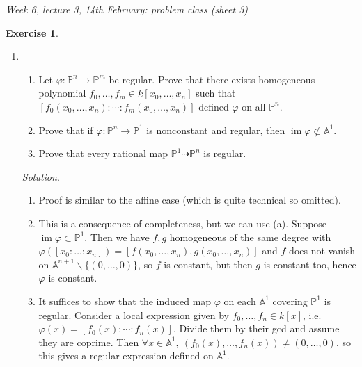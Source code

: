 \documentclass{article}
\newcommand{\A}{\mathbb{A}}
\newcommand{\p}{\mathbb{P}}
\newcommand{\im}{\operatorname{im}}
\theoremstyle{definition}
\newtheorem{exe}[defn]{Exercise}
\begin{document}
\begin{flushright}
\textit{Week 6, lecture 3, 14th February: problem class (sheet 3)}
\end{flushright}

\begin{exe}
\begin{enumerate}
\item \begin{enumerate}
\item Let $\varphi:\p^n\rightarrow\p^m$ be regular. Prove that there exists homogeneous polynomial $f_0,\ldots,f_m\in k[x_0,\ldots,x_n]$ such that $[f_0(x_0,\ldots,x_n):\cdots:f_m(x_0,\ldots,x_n)]$ defined $\varphi$ on all $\p^n$.
\item Prove that if $\varphi:\p^n\rightarrow\p^1$ is nonconstant and regular, then $\im\varphi\not\subset\A^1$.
\item Prove that every rational map $\p^1\dashrightarrow\p^n$ is regular.
\end{enumerate}
\textit{Solution}. \begin{enumerate}
\item Proof is similar to the affine case (which is quite technical so omitted).
\item This is a consequence of completeness, but we can use (a). Suppose $\im\varphi\subset\p^1$. Then we have $f,g$ homogeneous of the same degree with $\varphi([x_0:\ldots:x_n])=[f(x_0,\ldots,x_n),g(x_0,\ldots,x_n)]$ and $f$ does not vanish on $\A^{n+1}\backslash\{(0,\ldots,0)\}$, so $f$ is constant, but then $g$ is constant too, hence $\varphi$ is constant.
\item It suffices to show that the induced map $\varphi$ on each $\A^1$ covering $\p^1$ is regular. Consider a local expression given by $f_0,\ldots,f_n\in k[x]$, i.e. $\varphi(x)=[f_0(x):\cdots:f_n(x)]$. Divide them by their gcd and assume they are coprime. Then $\forall x\in\A^1,\ (f_0(x),\ldots,f_n(x))\neq (0,\ldots,0)$, so this gives a regular expression defined on $\A^1$.


\end{enumerate}
\end{enumerate}
\end{exe}
\end{document}
